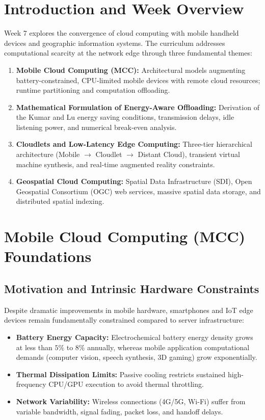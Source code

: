 \documentclass[11pt,a4paper,openany]{report}
\begin{document}
\section{Introduction and Week Overview}
Week 7 explores the convergence of cloud computing with mobile handheld devices and geographic information systems. The curriculum addresses computational scarcity at the network edge through three fundamental themes:
\begin{enumerate}[leftmargin=*]
  \item \textbf{Mobile Cloud Computing (MCC):} Architectural models augmenting battery-constrained, CPU-limited mobile devices with remote cloud resources; runtime partitioning and computation offloading.
  \item \textbf{Mathematical Formulation of Energy-Aware Offloading:} Derivation of the Kumar and Lu energy saving conditions, transmission delays, idle listening power, and numerical break-even analysis.
  \item \textbf{Cloudlets and Low-Latency Edge Computing:} Three-tier hierarchical architecture (Mobile $\to$ Cloudlet $\to$ Distant Cloud), transient virtual machine synthesis, and real-time augmented reality constraints.
  \item \textbf{Geospatial Cloud Computing:} Spatial Data Infrastructure (SDI), Open Geospatial Consortium (OGC) web services, massive spatial data storage, and distributed spatial indexing.
\end{enumerate}

\section{Mobile Cloud Computing (MCC) Foundations}
\subsection{Motivation and Intrinsic Hardware Constraints}
Despite dramatic improvements in mobile hardware, smartphones and IoT edge devices remain fundamentally constrained compared to server infrastructure:
\begin{itemize}[leftmargin=*]
  \item \textbf{Battery Energy Capacity:} Electrochemical battery energy density grows at less than $5\%$ to $8\%$ annually, whereas mobile application computational demands (computer vision, speech synthesis, 3D gaming) grow exponentially.
  \item \textbf{Thermal Dissipation Limits:} Passive cooling restricts sustained high-frequency CPU/GPU execution to avoid thermal throttling.
  \item \textbf{Network Variability:} Wireless connections (4G/5G, Wi-Fi) suffer from variable bandwidth, signal fading, packet loss, and handoff delays.
\end{itemize}
\end{document}
